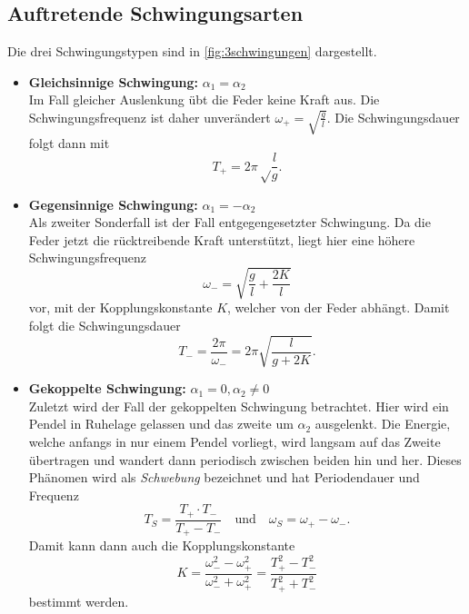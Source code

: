 \subsection{Auftretende Schwingungsarten}
\label{sec:Auftretende Schwingungsarten}
Die drei Schwingungstypen sind in \autoref{fig:3schwingungen} dargestellt.
\begin{itemize}
	\item \textbf{Gleichsinnige Schwingung:} $\alpha_1 = \alpha_2$ \\
		Im Fall gleicher Auslenkung übt die Feder keine Kraft aus. Die
		Schwingungsfrequenz ist daher unverändert $\omega_+ = \sqrt{\frac{g}{l}}$.
		Die Schwingungsdauer folgt dann mit
		\[
			T_+ = 2\pi \sqrt\frac{l}{g}.
		\]
	\item \textbf{Gegensinnige Schwingung:} $\alpha_1 = -\alpha_2$ \\
		Als zweiter Sonderfall ist der Fall entgegengesetzter Schwingung. Da die
		Feder jetzt die rücktreibende Kraft unterstützt, liegt hier eine höhere
		Schwingungsfrequenz 
		\[
			\omega_- = \sqrt{\frac gl + \frac{2K}{l}}
		\]
		vor, mit der Kopplungskonstante $K$, welcher von der Feder abhängt. 
		Damit folgt die Schwingungsdauer
		\[
			T_- = \frac{2\pi}{\omega_-} = 2\pi \sqrt{\frac{l}{g+2K}}.
		\]
	\item \textbf{Gekoppelte Schwingung:} $\alpha_1 = 0, \alpha_2 \neq 0$ \\
		Zuletzt wird der Fall der gekoppelten Schwingung betrachtet. Hier wird ein
		Pendel in Ruhelage gelassen und das zweite um $\alpha_2$ ausgelenkt. Die
		Energie, welche anfangs in nur einem Pendel vorliegt, wird langsam auf das
		Zweite übertragen und wandert dann periodisch zwischen beiden hin und her.
		Dieses Phänomen wird als \textit{Schwebung} bezeichnet und hat
		Periodendauer und Frequenz
		\[
			T_S = \frac{T_+ \cdot T_-}{T_+ - T_-}
			\quad
			\text{und}
			\quad
			\omega_S = \omega_+ - \omega_-.
		\]
		Damit kann dann auch die Kopplungskonstante 
		\begin{equation}
			K = \frac{\omega_-^2 - \omega_+^2}{\omega_-^2 + \omega_+^2}
			=\frac{T_+^2 - T_-^2}{T_+^2 + T_-^2}
			\label{eqn:kopplungskonstante}
		\end{equation}
		bestimmt werden.
\end{itemize}
